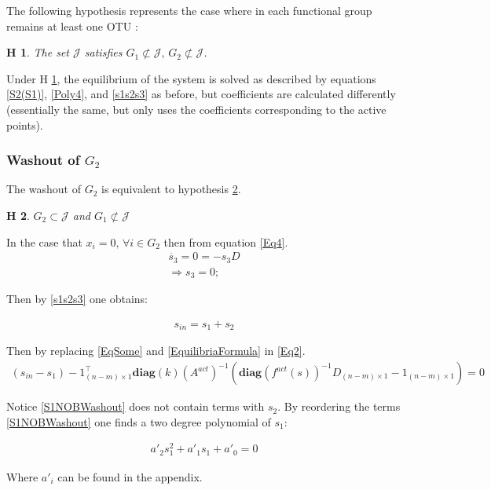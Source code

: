 \documentclass[3p,times]{elsarticle}
\newcommand{\diag}{\textbf{diag}}
\newtheorem{hypo}{H}
\begin{document}
The following hypothesis represents the case where in each functional group remains at least one OTU :
\begin{hypo}The set $\mathcal{J}$ satisfies $ G_1 \not \subset \mathcal{J} , \, G_2 \not \subset \mathcal{J} $.
	\label{noWashoutHyp}
\end{hypo} 

Under H \ref{noWashoutHyp}, the equilibrium of the system is solved as described by equations \eqref{S2(S1)}, \eqref{Poly4}, and \eqref{s1s2s3} as before, but coefficients are calculated differently (essentially the same, but only uses the coefficients corresponding to the active points).

\subsubsection{Washout of $G_2$}

The washout of $G_2$ is equivalent to  hypothesis \ref{WashoutG2}.

\begin{hypo}
	$G_2 \subset \mathcal{J}$ and $G_1 \not \subset \mathcal{J}$
	\label{WashoutG2}
\end{hypo} 

In the case that $x_i = 0, \, \forall i \in G_2$ then from equation \eqref{Eq4}.
\begin{align}
\dot{s_3} = 0 = -s_3D \\
\Rightarrow s_3 = 0;
\end{align}

Then by \eqref{s1s2s3} one obtains:

\begin{align}
s_{in} = s_1 + s_2
\end{align}

Then by replacing  \eqref{EqSome} and \eqref{EquilibriaFormula} in \eqref{Eq2}.
\begin{align}
\label{S1NOBWashout}  (s_{in}-s_1)-1_{(n-m)\times 1}^\top
\diag(k)(A^{act})^{-1}(\diag(f^{act}(s))^{-1}D_{(n-m)\times 1} - 1_{(n-m)\times 1}) = 0 
\end{align}

Notice \eqref{S1NOBWashout} does not contain terms with $s_2$. By reordering the terms \eqref{S1NOBWashout} one finds a two degree polynomial of $s_1$:

\begin{align}
a'_2 s_1^2 + a'_1s_1 + a'_0 = 0
\end{align}

Where $a'_i$ can be found in the appendix.
\end{document}
